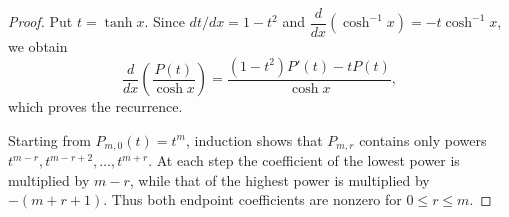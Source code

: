 \documentclass[10pt,a4paper]{amsart}
\begin{document}
\begin{proof}
Put \(t=\tanh x\). Since \(dt/dx=1-t^2\) and
\(\dfrac{d}{dx}(\cosh^{-1}x)=-t\cosh^{-1}x\), we obtain
\[
\frac{d}{dx}
\left(\frac{P(t)}{\cosh x}\right)
=
\frac{(1-t^2)P'(t)-tP(t)}{\cosh x},
\]
which proves the recurrence.

Starting from \(P_{m,0}(t)=t^m\), induction shows that
\(P_{m,r}\) contains only powers
\(t^{m-r},t^{m-r+2},\ldots,t^{m+r}\).
At each step the coefficient of the lowest power is multiplied by
\(m-r\), while that of the highest power is multiplied by
\(-(m+r+1)\). Thus both endpoint coefficients are nonzero for
\(0\leq r\leq m\).
\end{proof}
\end{document}
